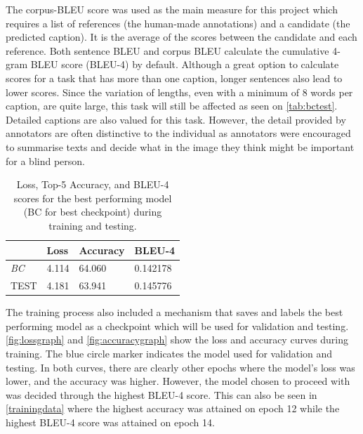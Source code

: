 \documentclass[11pt,a4paper]{article}
\begin{document}
The corpus-BLEU score was used as the main measure for this project which requires a list of references (the human-made annotations) and a candidate (the predicted caption). It is the average of the scores between the candidate and each reference. Both sentence BLEU and corpus BLEU calculate the cumulative 4-gram BLEU score (BLEU-4) by default. Although a great option to calculate scores for a task that has more than one caption, longer sentences also lead to lower scores. Since the variation of lengths, even with a minimum of 8 words per caption, are quite large, this task will still be affected as seen on \autoref{tab:bctest}. Detailed captions are also valued for this task. However, the detail provided by annotators are often distinctive to the individual as annotators were encouraged to summarise texts and decide what in the image they think might be important for a blind person.

\begin{table}[h]
\centering
\begin{tabular}{llll} 
\toprule
 & \textbf{Loss} & \textbf{Accuracy} & \textbf{BLEU-4} \\ 
\hline
\textit{BC} & 4.114 & 64.060 & 0.142178 \\
TEST & 4.181 & 63.941 & 0.145776 \\
\bottomrule
\end{tabular}
\vspace{2mm}
\caption{\label{tab:bctest}Loss, Top-5 Accuracy, and BLEU-4 scores for the best performing model (BC for best checkpoint) during training and testing.}
\end{table}

The training process also included a mechanism that saves and labels the best performing model as a checkpoint which will be used for validation and testing. \autoref{fig:lossgraph} and \autoref{fig:accuracygraph} show the loss and accuracy curves during training. The blue circle marker indicates the model used for validation and testing. In both curves, there are clearly other epochs where the model’s loss was lower, and the accuracy was higher. However, the model chosen to proceed with was decided through the highest BLEU-4 score. This can also be seen in \autoref{trainingdata} where the highest accuracy was attained on epoch 12 while the highest BLEU-4 score was attained on epoch 14. 
\end{document}
